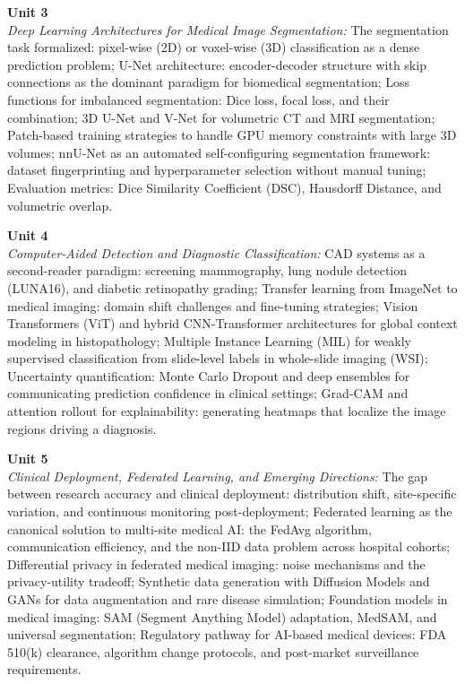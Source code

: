 \vspace{0.3cm}

\noindent\textbf{Unit 3} \\
\textit{Deep Learning Architectures for Medical Image Segmentation:} The segmentation task formalized: pixel-wise (2D) or voxel-wise (3D) classification as a dense prediction problem; U-Net architecture: encoder-decoder structure with skip connections as the dominant paradigm for biomedical segmentation; Loss functions for imbalanced segmentation: Dice loss, focal loss, and their combination; 3D U-Net and V-Net for volumetric CT and MRI segmentation; Patch-based training strategies to handle GPU memory constraints with large 3D volumes; nnU-Net as an automated self-configuring segmentation framework: dataset fingerprinting and hyperparameter selection without manual tuning; Evaluation metrics: Dice Similarity Coefficient (DSC), Hausdorff Distance, and volumetric overlap.

\vspace{0.3cm}

\noindent\textbf{Unit 4} \\
\textit{Computer-Aided Detection and Diagnostic Classification:} CAD systems as a second-reader paradigm: screening mammography, lung nodule detection (LUNA16), and diabetic retinopathy grading; Transfer learning from ImageNet to medical imaging: domain shift challenges and fine-tuning strategies; Vision Transformers (ViT) and hybrid CNN-Transformer architectures for global context modeling in histopathology; Multiple Instance Learning (MIL) for weakly supervised classification from slide-level labels in whole-slide imaging (WSI); Uncertainty quantification: Monte Carlo Dropout and deep ensembles for communicating prediction confidence in clinical settings; Grad-CAM and attention rollout for explainability: generating heatmaps that localize the image regions driving a diagnosis.

\vspace{0.3cm}

\noindent\textbf{Unit 5} \\
\textit{Clinical Deployment, Federated Learning, and Emerging Directions:} The gap between research accuracy and clinical deployment: distribution shift, site-specific variation, and continuous monitoring post-deployment; Federated learning as the canonical solution to multi-site medical AI: the FedAvg algorithm, communication efficiency, and the non-IID data problem across hospital cohorts; Differential privacy in federated medical imaging: noise mechanisms and the privacy-utility tradeoff; Synthetic data generation with Diffusion Models and GANs for data augmentation and rare disease simulation; Foundation models in medical imaging: SAM (Segment Anything Model) adaptation, MedSAM, and universal segmentation; Regulatory pathway for AI-based medical devices: FDA 510(k) clearance, algorithm change protocols, and post-market surveillance requirements.

\newpage
{}